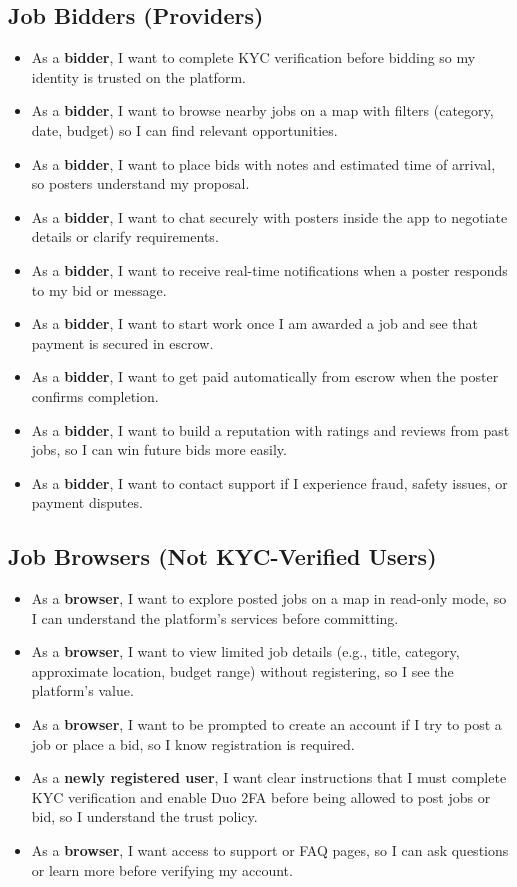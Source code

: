 \documentclass[11pt]{article}
\begin{document}
\subsection*{Job Bidders (Providers)}
\begin{itemize}[leftmargin=1.4em]
  \item As a \textbf{bidder}, I want to complete KYC verification before bidding so my identity is trusted on the platform.
  \item As a \textbf{bidder}, I want to browse nearby jobs on a map with filters (category, date, budget) so I can find relevant opportunities.
  \item As a \textbf{bidder}, I want to place bids with notes and estimated time of arrival, so posters understand my proposal.
  \item As a \textbf{bidder}, I want to chat securely with posters inside the app to negotiate details or clarify requirements.
  \item As a \textbf{bidder}, I want to receive real-time notifications when a poster responds to my bid or message.
  \item As a \textbf{bidder}, I want to start work once I am awarded a job and see that payment is secured in escrow.
  \item As a \textbf{bidder}, I want to get paid automatically from escrow when the poster confirms completion.
  \item As a \textbf{bidder}, I want to build a reputation with ratings and reviews from past jobs, so I can win future bids more easily.
  \item As a \textbf{bidder}, I want to contact support if I experience fraud, safety issues, or payment disputes.
\end{itemize}

\subsection*{Job Browsers (Not KYC-Verified Users)}
\begin{itemize}[leftmargin=1.4em]
  \item As a \textbf{browser}, I want to explore posted jobs on a map in read-only mode, so I can understand the platform's services before committing.
  \item As a \textbf{browser}, I want to view limited job details (e.g., title, category, approximate location, budget range) without registering, so I see the platform’s value.
  \item As a \textbf{browser}, I want to be prompted to create an account if I try to post a job or place a bid, so I know registration is required.
  \item As a \textbf{newly registered user}, I want clear instructions that I must complete KYC verification and enable Duo 2FA before being allowed to post jobs or bid, so I understand the trust policy.
  \item As a \textbf{browser}, I want access to support or FAQ pages, so I can ask questions or learn more before verifying my account.
\end{itemize}
\end{document}
